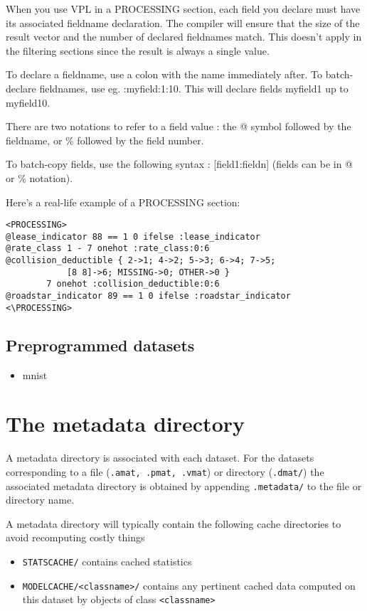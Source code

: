 \documentclass[11pt]{book}
\begin{document}
When you use VPL in a PROCESSING section, each field you declare must have its associated fieldname declaration. The compiler will ensure that the size of the result vector and the number of declared fieldnames match. This doesn't apply in the filtering sections since the result is always a single value. 

To declare a fieldname, use a colon with the name immediately after. To batch-declare fieldnames, use eg. :myfield:1:10. This will declare fields myfield1 up to myfield10.

There are two notations to refer to a field value  : the @ symbol followed by the fieldname, or \% followed by the field number.

To batch-copy fields, use the following syntax : [field1:fieldn] (fields can be in @ or \% notation).

Here's a real-life example of a PROCESSING section:

\begin{verbatim}
<PROCESSING>
@lease_indicator 88 == 1 0 ifelse :lease_indicator
@rate_class 1 - 7 onehot :rate_class:0:6
@collision_deductible { 2->1; 4->2; 5->3; 6->4; 7->5; 
			[8 8]->6; MISSING->0; OTHER->0 }
		7 onehot :collision_deductible:0:6
@roadstar_indicator 89 == 1 0 ifelse :roadstar_indicator
<\PROCESSING>
\end{verbatim}

\subsection{Preprogrammed datasets}

\begin{itemize}
\item mnist
\end{itemize}

\section{The metadata directory}

A metadata directory is associated with each dataset.  For the datasets
corresponding to a file ({\tt .amat, .pmat, .vmat}) or directory ({\tt .dmat/}) the
associated metadata directory is obtained by appending {\tt .metadata/} to the
file or directory name.

A metadata directory will typically contain the following cache directories to avoid recomputing costly things

\begin{itemize}
\item \verb!STATSCACHE/! contains cached statistics
\item \verb!MODELCACHE/<classname>/! contains any pertinent cached data computed on this dataset by objects of class \verb!<classname>!
\end{itemize}
\end{document}
